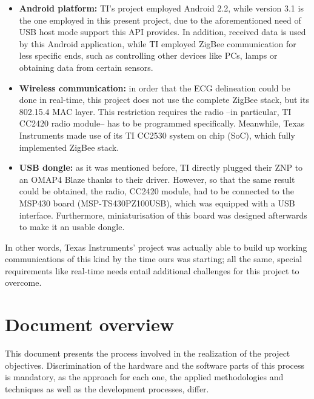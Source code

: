\begin{itemize}
\begin{itemize}
					\item \textbf{Android platform:} TI's project employed Android 2.2, while version 3.1 is the
						one employed in this present project, due to the aforementioned need of USB host mode support 
						this API provides. In addition, received data is used by this Android application, while TI
						employed ZigBee communication for less specific ends, such as controlling other devices
						like PCs, lamps or obtaining data from certain sensors.
					\item \textbf{Wireless communication:} in order that the ECG delineation could be done in
						real-time, this project does not use the complete ZigBee stack, but its 802.15.4 MAC
						layer. This restriction requires the radio --in particular, TI CC2420 radio module-- has
						to be programmed specifically. Meanwhile, Texas Instruments made use of its TI CC2530 system on chip (SoC), which fully implemented ZigBee stack.
					\item \textbf{USB dongle:} as it was mentioned before, TI directly plugged their ZNP to an
						OMAP4 Blaze thanks to their driver. However, so that the same result could be obtained,
						the radio, CC2420 module, had to be connected to the MSP430 board (MSP-TS430PZ100USB),
						which was equipped with a USB interface. Furthermore, miniaturisation of this board was
						designed afterwards to make it an usable dongle.
				\end{itemize}
				In other words, Texas Instruments' project was actually able to build up working communications
				of this kind by the time ours was starting; all the same, special requirements like real-time
				needs entail additional challenges for this project to overcome.
		\end{itemize}
	
	\section{Document overview}
	\label{sec:prj-oview}
		This document presents the process involved in the realization of the project objectives. Discrimination of the hardware and the software parts of this process is mandatory, as the approach for each one, the applied methodologies and techniques as well as the development processes, differ.\\

